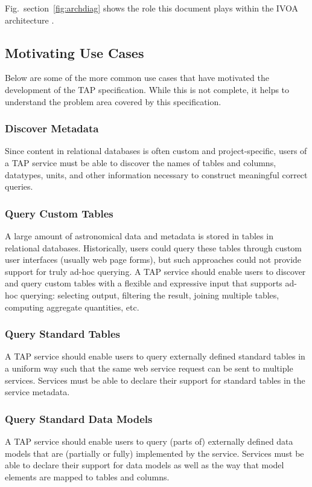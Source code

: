 \documentclass[11pt,letter]{ivoa}
\begin{document}
Fig.~section~\ref{fig:archdiag} shows the role this document plays within the
IVOA architecture \citep{note:VOARCH}.


\subsection{Motivating Use Cases}
Below are some of the more common use cases that have motivated the development 
of the TAP specification. While this is not complete, it helps to understand the 
problem area covered by this specification.

\subsubsection{Discover Metadata}
Since content in relational databases is often custom and project-specific, 
users of a TAP service must be able to discover the names of tables and 
columns, datatypes, units, and other information necessary to construct 
meaningful correct queries.

\subsubsection{Query Custom Tables}
A large amount of astronomical data and metadata is stored in tables in 
relational databases. Historically, users could query these tables through 
custom user interfaces (usually web page forms), but such approaches could not 
provide support for truly ad-hoc querying. A TAP service should enable users to 
discover and query custom tables with a flexible and expressive input that 
supports ad-hoc querying: selecting output, filtering the result, joining 
multiple tables, computing aggregate quantities, etc. 

\subsubsection{Query Standard Tables}
A TAP service should enable users to query externally defined standard tables 
in a uniform way such that the same web service request can be sent to multiple 
services. Services must be able to declare their support for standard tables in 
the service metadata.

\subsubsection{Query Standard Data Models}
A TAP service should enable users to query (parts of) externally defined data 
models that are (partially or fully) implemented by the service. Services must 
be able to declare their support for data models as well as the way that model 
elements are mapped to tables and columns.
\end{document}
